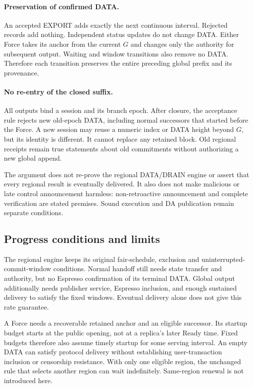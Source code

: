\documentclass[11pt,a4paper]{article}
\newcounter{protocol}
\begin{document}
\paragraph{Preservation of confirmed DATA.}
An accepted EXPORT adds exactly the next continuous interval. Rejected
records add nothing. Independent status updates do not change DATA.
Either Force takes its anchor from the current $G$ and changes only the
authority for subsequent output. Waiting and window transitions also
remove no DATA. Therefore each transition preserves the entire preceding
global prefix and its provenance.

\paragraph{No re-entry of the closed suffix.}
All outputs bind a session and its branch epoch. After closure, the
acceptance rule rejects new old-epoch DATA, including normal successors
that started before the Force. A new session may reuse a numeric index
or DATA height beyond $G$, but its identity is different. It cannot
replace any retained block. Old regional receipts remain true statements
about old commitments without authorizing a new global append.

The argument does not re-prove the regional DATA/DRAIN engine or assert
that every regional result is eventually delivered. It also does not
make malicious or late control announcement harmless: non-retroactive
announcement and complete verification are stated premises. Sound
execution and DA publication remain separate conditions.

\subsection{Progress conditions and limits}
The regional engine keeps its original fair-schedule, exclusion and
uninterrupted-commit-window conditions. Normal handoff still needs
state transfer and authority, but no Espresso confirmation of its
terminal DATA. Global output additionally needs publisher service,
Espresso inclusion, and enough sustained delivery to satisfy the fixed
windows. Eventual delivery alone does not give this rate guarantee.

A Force needs a recoverable retained anchor and an eligible successor.
Its startup budget starts at the public opening, not at a replica's
later Ready time. Fixed budgets therefore also assume timely startup
for some serving interval. An empty DATA can satisfy protocol delivery
without establishing user-transaction inclusion or censorship resistance.
With only one eligible region, the unchanged rule that selects another
region can wait indefinitely. Same-region renewal is not introduced here.
\end{document}
